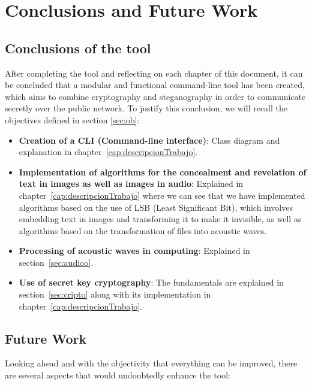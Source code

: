 \chapter*{Conclusions and Future Work}
\label{cap:conclusions}

\section{Conclusions of the tool }

After completing the tool and reflecting on each chapter of this document, it can be concluded that a modular and functional command-line tool has been created, which aims to combine cryptography and steganography in order to communicate secretly over the public network. To justify this conclusion, we will recall the objectives defined in section \ref{sec:ob}:

\begin{itemize}
    \item \textbf{Creation of a CLI (Command-line interface)}:
    Class diagram and explanation in chapter~\ref{cap:descripcionTrabajo}.
    
    \item \textbf{Implementation of algorithms for the concealment and revelation of text in images as well as images in audio}:
    Explained in chapter~\ref{cap:descripcionTrabajo} where we can see that we have implemented algorithms based on the use of LSB (Least Significant Bit), which involves embedding text in images and transforming it to make it invisible, as well as algorithms based on the transformation of files into acoustic waves.
    
    \item \textbf{Processing of acoustic waves in computing}: 
    Explained in section~\ref{sec:audioo}.
    
    \item \textbf{Use of secret key cryptography}: 
    The fundamentals are explained in section~\ref{sec:cripto} along with its implementation in chapter~\ref{cap:descripcionTrabajo}.
\end{itemize}


\section{ Future Work }
 
Looking ahead and with the objectivity that everything can be improved, there are several aspects that would undoubtedly enhance the tool:


